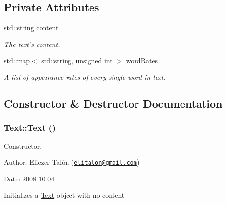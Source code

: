 \subsection*{Private Attributes}
\begin{CompactItemize}
\item 
\hypertarget{class_text_8c5acddb86730d41099c87da7e386f6c}{
std::string \hyperlink{class_text_8c5acddb86730d41099c87da7e386f6c}{content\_\-}}
\label{class_text_8c5acddb86730d41099c87da7e386f6c}

\begin{CompactList}\small\item\em The text's content. \item\end{CompactList}\item 
\hypertarget{class_text_5f7e6b9d9ba0dbd7c1b4070ab42f1de1}{
std::map$<$ std::string, unsigned int $>$ \hyperlink{class_text_5f7e6b9d9ba0dbd7c1b4070ab42f1de1}{wordRates\_\-}}
\label{class_text_5f7e6b9d9ba0dbd7c1b4070ab42f1de1}

\begin{CompactList}\small\item\em A list of appearance rates of every single word in text. \item\end{CompactList}\end{CompactItemize}


\subsection{Constructor \& Destructor Documentation}
\hypertarget{class_text_b3e26143fccc52699bcc5149cae852bc}{
\subsubsection[Text]{\setlength{\rightskip}{0pt plus 5cm}Text::Text ()}}
\label{class_text_b3e26143fccc52699bcc5149cae852bc}


Constructor. 

\begin{Desc}
\item[Author:]Eliezer Talón (\href{mailto:elitalon@gmail.com}{\tt elitalon@gmail.com}) \end{Desc}
\begin{Desc}
\item[Date:]2008-10-04\end{Desc}
Initializes a \hyperlink{class_text}{Text} object with no content 

